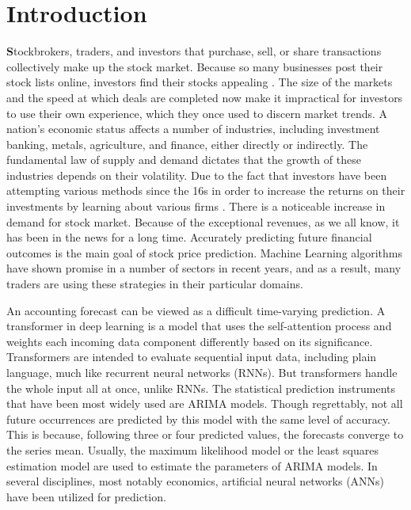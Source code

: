 \chapter{Introduction}
\label{ch:into} %

\textbf Stockbrokers, traders, and investors that purchase, sell, or share transactions collectively make up the stock market. Because so many businesses post their stock lists online, investors find their stocks appealing \cite{bhattacharjee2019stock}. The size of the markets and the speed at which deals are completed now make it impractical for investors to use their own experience, which they once used to discern market trends. A nation's economic status affects a number of industries, including investment banking, metals, agriculture, and finance, either directly or indirectly. The fundamental law of supply and demand dictates that the growth of these industries depends on their volatility. Due to the fact that investors have been attempting various methods since the 16s in order to increase the returns on their investments by learning about various firms \cite{mehta2021stock}. There is a noticeable increase in demand for stock market. Because of the exceptional revenues, as we all know, it has been in the news for a long time. Accurately predicting future financial outcomes is the main goal of stock price prediction. Machine Learning algorithms have shown promise in a number of sectors in recent years, and as a result, many traders are using these strategies in their particular domains. 


An accounting forecast can be viewed as a difficult time-varying prediction. A transformer in deep learning is a model that uses the self-attention process and weights each incoming data component differently based on its significance. Transformers are intended to evaluate sequential input data, including plain language, much like recurrent neural networks (RNNs). But transformers handle the whole input all at once, unlike RNNs. The statistical prediction instruments that have been most widely used are ARIMA models. Though regrettably, not all future occurrences are predicted by this model with the same level of accuracy. This is because, following three or four predicted values, the forecasts converge to the series mean. Usually, the maximum likelihood model or the least squares estimation model are used to estimate the parameters of ARIMA models. In several disciplines, most notably economics, artificial neural networks (ANNs) have been utilized for prediction. 

